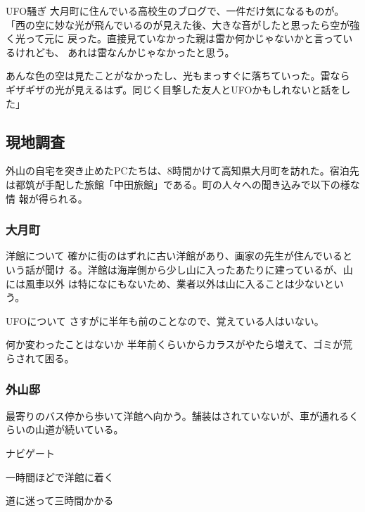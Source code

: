 \documentclass[a4paper,8pt,min]{jsarticle}
\begin{document}
\begin{topic}
 \item[UFO騒ぎ]
 大月町に住んでいる高校生のブログで、一件だけ気になるものが。\\

 「西の空に妙な光が飛んでいるのが見えた後、大きな音がしたと思ったら空が強く光って元に
 戻った。直接見ていなかった親は雷か何かじゃないかと言っているけれども、
 あれは雷なんかじゃなかったと思う。

 あんな色の空は見たことがなかったし、光もまっすぐに落ちていった。雷なら
 ギザギザの光が見えるはず。同じく目撃した友人とUFOかもしれないと話をした」
\end{topic}
\newpage

\subsection{現地調査}
外山の自宅を突き止めたPCたちは、8時間かけて高知県大月町を訪れた。宿泊先
は都筑が手配した旅館「中田旅館」である。町の人々への聞き込みで以下の様な情
報が得られる。

\subsubsection{大月町}

\begin{topic}
 \item[洋館について]
 確かに街のはずれに古い洋館があり、画家の先生が住んでいるという話が聞け
 る。洋館は海岸側から少し山に入ったあたりに建っているが、山には風車以外
 は特になにもないため、業者以外は山に入ることは少ないという。
 \item[UFOについて]
 さすがに半年も前のことなので、覚えている人はいない。
 \item[何か変わったことはないか]
 半年前くらいからカラスがやたら増えて、ゴミが荒らされて困る。
\end{topic}

\subsubsection{外山邸}

最寄りのバス停から歩いて洋館へ向かう。舗装はされていないが、車が通れるく
らいの山道が続いている。
\begin{judge}{ナビゲート}
 \item 一時間ほどで洋館に着く
 \item 道に迷って三時間かかる
\end{judge}
\end{document}

